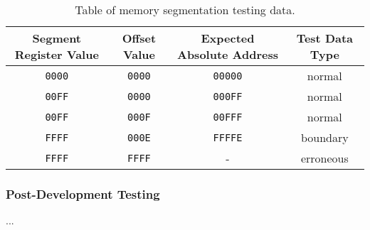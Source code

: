         \begin{table}
            \begin{tabular}{ | c | c | c | c | }
                \hline
                Segment Register Value & Offset Value & Expected Absolute Address & Test Data Type \\
                \hline
                \texttt{0000} & \texttt{0000} & \texttt{00000} & normal \\
                \texttt{00FF} & \texttt{0000} & \texttt{000FF} & normal \\
                \texttt{00FF} & \texttt{000F} & \texttt{00FFF} & normal \\
                \texttt{FFFF} & \texttt{000E} & \texttt{FFFFE} & boundary \\
                \texttt{FFFF} & \texttt{FFFF} & - & erroneous \\
                \hline
            \end{tabular}
            \label{table:segmentation-test-data}
            \caption{Table of memory segmentation testing data.}
        \end{table}

    \subsubsection{Post-Development Testing}
        ...
